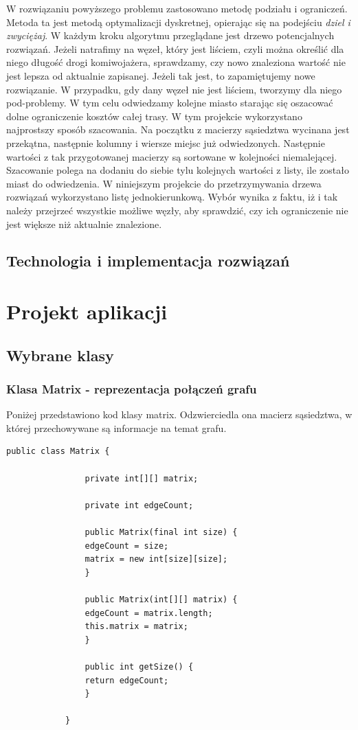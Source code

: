 \documentclass{article}
\begin{document}
				W rozwiązaniu powyższego problemu zastosowano metodę podziału i ograniczeń. Metoda ta jest metodą optymalizacji dyskretnej, opierając się na podejściu \textit{dziel i zwyciężaj}.
				W każdym kroku algorytmu przeglądane jest drzewo potencjalnych rozwiązań. Jeżeli natrafimy na węzeł, który jest liściem, czyli można określić dla niego długość drogi komiwojażera, sprawdzamy, czy nowo znaleziona wartość nie jest lepsza od aktualnie zapisanej. Jeżeli tak jest, to zapamiętujemy nowe rozwiązanie. W przypadku, gdy dany węzeł nie jest liściem, tworzymy dla niego pod-problemy. W tym celu odwiedzamy kolejne miasto starając się oszacować dolne ograniczenie kosztów całej trasy. W tym projekcie wykorzystano najprostszy sposób szacowania. Na początku z macierzy sąsiedztwa wycinana jest przekątna, następnie kolumny i wiersze miejsc już odwiedzonych. Następnie wartości z tak przygotowanej macierzy są sortowane w kolejności niemalejącej. Szacowanie polega na dodaniu do siebie tylu kolejnych wartości z listy, ile zostało miast do odwiedzenia. W niniejszym projekcie do przetrzymywania drzewa rozwiązań wykorzystano listę jednokierunkową. Wybór wynika z faktu, iż i tak należy przejrzeć wszystkie możliwe węzły, aby sprawdzić, czy ich ograniczenie nie jest większe niż aktualnie znalezione.
	\subsection{Technologia i implementacja rozwiązań}			
\section{Projekt aplikacji}	
	\subsection{Wybrane klasy}
	
		\subsubsection{Klasa Matrix - reprezentacja połączeń grafu}
			Poniżej przedstawiono kod klasy matrix. Odzwierciedla ona macierz sąsiedztwa, w której przechowywane są informacje na temat grafu.
			
			\begin{lstlisting}[xleftmargin=-100pt]
			public class Matrix {
			
				private int[][] matrix;
			
				private int edgeCount;
				
				public Matrix(final int size) {
				edgeCount = size;
				matrix = new int[size][size];
				}
				
				public Matrix(int[][] matrix) {
				edgeCount = matrix.length;
				this.matrix = matrix;
				}
										
				public int getSize() {
				return edgeCount;
				}
				
			}
			\end{lstlisting}
\end{document}
